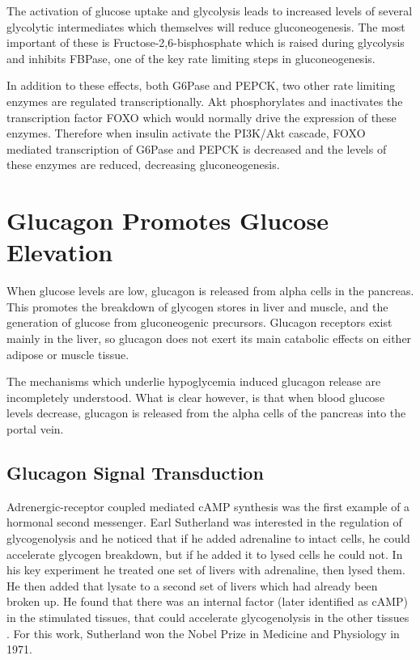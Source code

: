 \documentclass{tufte-handout}
\begin{document}
The activation of glucose uptake and glycolysis leads to increased levels of several glycolytic intermediates which themselves will reduce gluconeogenesis.  The most important of these is Fructose-2,6-bisphosphate which is raised during glycolysis and inhibits FBPase, one of the key rate limiting steps in gluconeogenesis.

In addition to these effects, both G6Pase and PEPCK, two other rate limiting enzymes are regulated transcriptionally.  Akt phosphorylates and inactivates the transcription factor FOXO which would normally drive the expression of these enzymes.  Therefore when insulin activate the PI3K/Akt cascade, FOXO mediated transcription of G6Pase and PEPCK is decreased and the levels of these enzymes are reduced, decreasing gluconeogenesis.

\section{Glucagon Promotes Glucose Elevation}

 When glucose levels are low, glucagon is released from alpha cells in the pancreas.  This promotes the breakdown of glycogen stores in liver and muscle, and the generation of glucose from gluconeogenic precursors.  Glucagon receptors exist mainly in the liver, so glucagon does not exert its main catabolic effects on either adipose or muscle tissue. 

The mechanisms which underlie hypoglycemia induced glucagon release are incompletely understood.  What is clear however, is that when blood glucose levels decrease, glucagon is released from the alpha cells of the pancreas into the portal vein.

\subsection{Glucagon Signal Transduction}

Adrenergic-receptor coupled mediated cAMP synthesis was the first example of a hormonal second messenger.  Earl Sutherland was interested in the regulation of glycogenolysis and he noticed that if he added adrenaline to intact cells, he could accelerate glycogen breakdown, but if he added it to lysed cells he could not.  In his key experiment he treated one set of livers with adrenaline, then lysed them.  He then added that lysate to a second set of livers which had already been broken up.  He found that there was an internal factor (later identified as cAMP) in the stimulated tissues, that could accelerate glycogenolysis in the other tissues \cite{Rall1956}.  For this work, Sutherland won the Nobel Prize in Medicine and Physiology in 1971.
\end{document}
